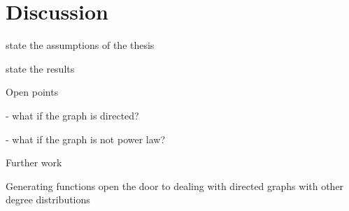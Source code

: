 \chapter{Discussion} %
\label{cha:discussion}


state the assumptions of the thesis

state the results

Open points

- what if the graph is directed?

- what if the graph is not power law?



Further work


Generating functions open the door to dealing with directed graphs with other degree distributions







